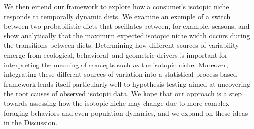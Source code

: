 \documentclass{article}
\begin{document}
We then extend our framework to explore how a consumer's isotopic niche responds to temporally dynamic diets.
We examine an example of a switch between two probabilistic diets that oscillates between, for example, seasons, and show analytically that the maximum expected isotopic niche width occurs during the transitions between diets.
Determining how different sources of variability emerge from ecological, behavioral, and geometric drivers is important for interpreting the meaning of concepts such as the isotopic niche.
Moreover, integrating these different sources of variation into a statistical process-based framework lends itself particularly well to hypothesis-testing aimed at uncovering the root causes of observed isotopic data.
We hope that our approach is a step towards assessing how the isotopic niche may change due to more complex foraging behaviors and even population dynamics, and we expand on these ideas in the Discussion.



%





\end{document}

